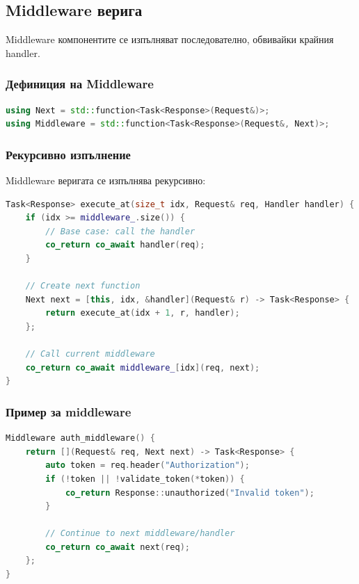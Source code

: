 \subsection{Middleware верига}

Middleware компонентите се изпълняват последователно, обвивайки крайния handler.

\subsubsection{Дефиниция на Middleware}

\begin{lstlisting}[language=C++, basicstyle=\small\ttfamily, caption={Middleware тип}]
using Next = std::function<Task<Response>(Request&)>;
using Middleware = std::function<Task<Response>(Request&, Next)>;
\end{lstlisting}

\subsubsection{Рекурсивно изпълнение}

Middleware веригата се изпълнява рекурсивно:

\begin{lstlisting}[language=C++, basicstyle=\small\ttfamily, caption={Изпълнение на middleware верига}]
Task<Response> execute_at(size_t idx, Request& req, Handler handler) {
    if (idx >= middleware_.size()) {
        // Base case: call the handler
        co_return co_await handler(req);
    }
    
    // Create next function
    Next next = [this, idx, &handler](Request& r) -> Task<Response> {
        return execute_at(idx + 1, r, handler);
    };
    
    // Call current middleware
    co_return co_await middleware_[idx](req, next);
}
\end{lstlisting}

\subsubsection{Пример за middleware}

\begin{lstlisting}[language=C++, basicstyle=\small\ttfamily, caption={Authentication middleware}]
Middleware auth_middleware() {
    return [](Request& req, Next next) -> Task<Response> {
        auto token = req.header("Authorization");
        if (!token || !validate_token(*token)) {
            co_return Response::unauthorized("Invalid token");
        }
        
        // Continue to next middleware/handler
        co_return co_await next(req);
    };
}
\end{lstlisting}

